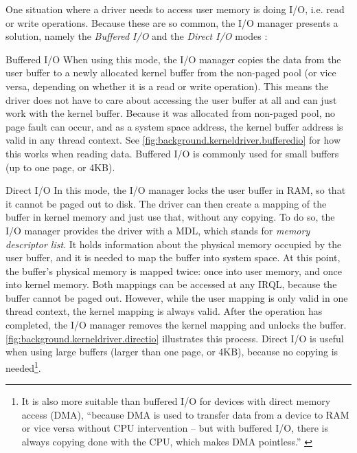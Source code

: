 One situation where a driver needs to access user memory is doing I/O, i.e. read or write operations. Because these are so common, the I/O manager presents a solution, namely the \emph{Buffered I/O} and the \emph{Direct I/O} modes \cite{Yosifovich2017}:
\begin{descitemize}
	\item[Buffered I/O] When using this mode, the I/O manager copies the data from the user buffer to a newly allocated kernel buffer from the non-paged pool (or vice versa, depending on whether it is a read or write operation). This means the driver does not have to care about accessing the user buffer at all and can just work with the kernel buffer. Because it was allocated from non-paged pool, no page fault can occur, and as a system space address, the kernel buffer address is valid in any thread context. See \autoref{fig:background.kerneldriver.bufferedio} for how this works when reading data. Buffered I/O is commonly used for small buffers (up to one page, or 4KB).
	\item[Direct I/O] In this mode, the I/O manager locks the user buffer in RAM, so that it cannot be paged out to disk. The driver can then create a mapping of the buffer in kernel memory and just use that, without any copying. To do so, the I/O manager provides the driver with a MDL, which stands for \emph{memory descriptor list}. It holds information about the physical memory occupied by the user buffer, and it is needed to map the buffer into system space. At this point, the buffer's physical memory is mapped twice: once into user memory, and once into kernel memory. Both mappings can be accessed at any IRQL, because the buffer cannot be paged out. However, while the user mapping is only valid in one thread context, the kernel mapping is always valid. After the operation has completed, the I/O manager removes the kernel mapping and unlocks the buffer. \autoref{fig:background.kerneldriver.directio} illustrates this process. Direct I/O is useful when using large buffers (larger than one page, or 4KB), because no copying is needed\footnote{\label{fn:background.kerneldriver.dma} It is also more suitable than buffered I/O for devices with direct memory access (DMA), ``because DMA is used to transfer data from a device to RAM or vice versa without CPU intervention -- but with buffered I/O, there is always copying done with the CPU, which makes DMA pointless.'' \cite{Yosifovich2017}}.
\end{descitemize}

